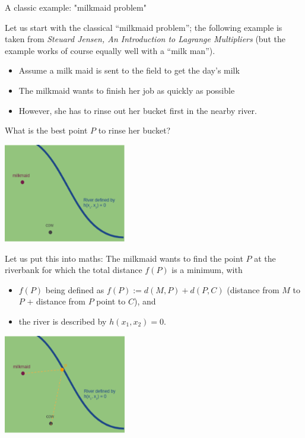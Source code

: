 \documentclass[11pt,compress,t,notes=noshow, xcolor=table]{beamer}
\begin{document}
\begin{vbframe}{A classic example: "milkmaid problem"}

Let us start with the classical \enquote{milkmaid problem}; the following example is taken from \textit{Steuard Jensen, An Introduction to Lagrange Multipliers} (but the example works of course equally well with a \enquote{milk man}). 

\begin{itemize}
	\item Assume a milk maid is sent to the field to get the day's milk
	\item The milkmaid wants to finish her job as quickly as possible
	\item However, she has to rinse out her bucket first in the nearby river. 
\end{itemize}

What is the best point $P$ to rinse her bucket? 

\begin{center}
	\includegraphics[width = 0.4\textwidth]{figure_man/milkmaid1.png}
\end{center}

\framebreak 

Let us put this into maths: The milkmaid wants to find the point $P$ at the riverbank for which the total distance $f(P)$ is a minimum, with

\begin{itemize} 
\item $f(P)$ being defined as $f(P) := d(M, P) + d(P, C)$ 
(distance from $M$ to $P$ + distance from $P$ point to $C$), and
\item the river is described by $h(x_1, x_2) = 0$. 
\end{itemize}

\begin{center}
	\includegraphics[width = 0.4\textwidth]{figure_man/milkmaid2.png}
\end{center}



\end{vbframe}
\end{document}
